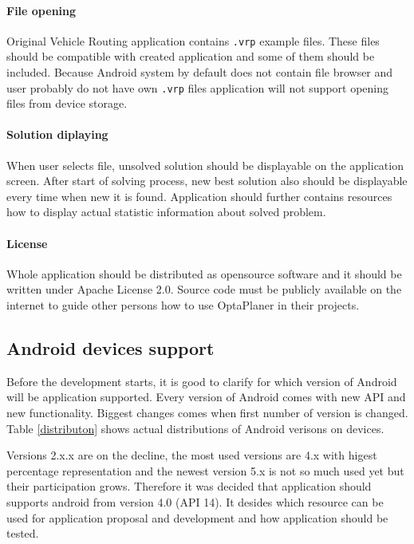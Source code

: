 \paragraph{File opening}
Original Vehicle Routing application contains \texttt{.vrp} example files. These files should be compatible with created
application and some of them should be included. Because Android system by default does not contain file browser and
user probably do not have own \texttt{.vrp} files application will not support opening files from device storage.

\paragraph{Solution diplaying}
When user selects file, unsolved solution should be displayable on the application screen. After start of solving
process, new best solution also should be displayable every time when new it is found. Application should further
contains resources how to display actual statistic information about solved problem.

\paragraph{License}
Whole application should be distributed as opensource software and it should be written under Apache License 2.0.
Source code must be publicly available on the internet to guide other persons how to use OptaPlaner in their projects.

\subsection{Android devices support}
Before the development starts, it is good to clarify for which version of Android will be application supported. Every
version of Android comes with new API and new functionality. Biggest changes comes when first number of version is
changed. Table \ref{distributon} shows actual distributions of Android verisons on devices.

Versions 2.x.x are on the decline, the most used versions are 4.x with higest percentage representation and the newest
version 5.x is not so much used yet but their participation grows. Therefore it was decided that application should
supports android from version 4.0 (API 14). It desides which resource can be used for application proposal and
development and how application should be tested.

